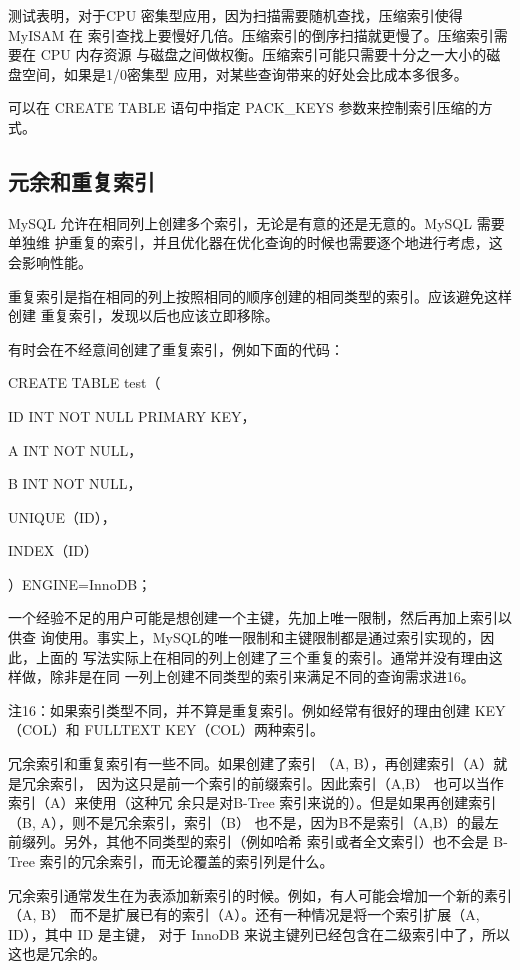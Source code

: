 测试表明，对于CPU 密集型应用，因为扫描需要随机查找，压缩索引使得 MyISAM 在
索引查找上要慢好几倍。压缩索引的倒序扫描就更慢了。压缩索引需要在 CPU 内存资源
与磁盘之间做权衡。压缩索引可能只需要十分之一大小的磁盘空间，如果是1/0密集型
应用，对某些查询带来的好处会比成本多很多。

可以在 CREATE TABLE 语句中指定 PACK\_KEYS 参数来控制索引压缩的方式。

\subsection{元余和重复索引}
MySQL 允许在相同列上创建多个索引，无论是有意的还是无意的。MySQL 需要单独维
护重复的索引，并且优化器在优化查询的时候也需要逐个地进行考虑，这会影响性能。

重复索引是指在相同的列上按照相同的顺序创建的相同类型的索引。应该避免这样创建
重复索引，发现以后也应该立即移除。

有时会在不经意间创建了重复索引，例如下面的代码：

CREATE TABLE test（

ID INT NOT NULL PRIMARY KEY，

A INT NOT NULL，

B INT NOT NULL，

UNIQUE（ID），

INDEX（ID）

）ENGINE=InnoDB；

一个经验不足的用户可能是想创建一个主键，先加上唯一限制，然后再加上索引以供查
询使用。事实上，MySQL的唯一限制和主键限制都是通过索引实现的，因此，上面的
写法实际上在相同的列上创建了三个重复的索引。通常并没有理由这样做，除非是在同
一列上创建不同类型的索引来满足不同的查询需求进16。

注16：如果索引类型不同，并不算是重复索引。例如经常有很好的理由创建 KEY（COL）和 FULLTEXT
KEY（COL）两种索引。

冗余索引和重复索引有一些不同。如果创建了索引 （A, B），再创建索引（A）就是冗余索引，
因为这只是前一个索引的前缀索引。因此索引（A,B） 也可以当作索引（A）来使用（这种冗
余只是对B-Tree 索引来说的）。但是如果再创建索引（B, A），则不是冗余索引，索引（B）
也不是，因为B不是索引（A,B）的最左前缀列。另外，其他不同类型的索引（例如哈希
索引或者全文索引）也不会是 B-Tree 索引的冗余索引，而无论覆盖的索引列是什么。

冗余索引通常发生在为表添加新索引的时候。例如，有人可能会增加一个新的素引（A, B）
而不是扩展已有的索引（A）。还有一种情况是将一个索引扩展（A, ID），其中 ID 是主键，
对于 InnoDB 来说主键列已经包含在二级索引中了，所以这也是冗余的。

